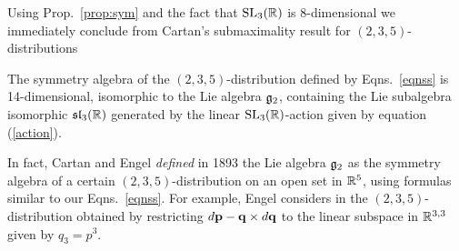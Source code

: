  


Using Prop.~\ref{prop:sym} and the fact
that ${\mathrm{SL}_3(\mathbb{R})}$ is $8$-dimensional we immediately conclude from Cartan's submaximality result for $(2,3,5)$-distributions  

\begin{theorem} \label{sym}
The symmetry algebra of the $(2,3,5)$-distribution defined by Eqns.~\eqref{eqnss}   is 14-dimensional,
isomorphic to the Lie algebra ${\mathfrak{g}}_2$, containing the Lie  subalgebra isomorphic $\mathfrak{sl}_3(\mathbb{R})$ generated by the linear ${\mathrm{SL}_3(\mathbb{R})}$-action given by equation (\ref{action}). 
\end{theorem}



\begin{rmrk} In fact, Cartan \cite{C1} and Engel \cite{Eng} {\em defined} in 1893 the Lie algebra
${\mathfrak{g}}_2$ as the symmetry algebra of a certain 
$(2,3,5)$-distribution on an open set in $\mathbb{R}^5$, using formulas similar to our Eqns.~\eqref{eqnss}.
For example, Engel considers in \cite{Eng} the $(2,3,5)$-distribution obtained by restricting $ d{\mathbf p}-\mathbf q\times d\mathbf q$   to the linear subspace in $\mathbb{R}^{3,3}$ given by $q_3=p^3$. 
\end{rmrk}







